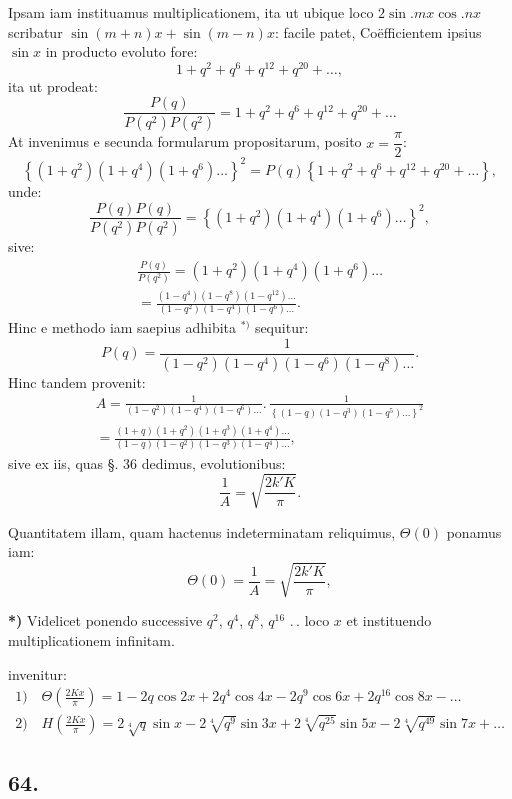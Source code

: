 \documentclass{article}
\begin{document}
Ipsam iam instituamus multiplicationem, ita ut ubique loco $2\sin.mx\cos.nx$ scribatur $\sin(m+n)x+\sin(m-n)x$: facile patet, Coëfficientem ipsius $\sin x$ in producto evoluto fore:
\[
1+q^{2}+q^{6}+q^{12}+q^{20}+\ldots,
\]
ita ut prodeat:
\[
\frac{P(q)}{P(q^{2})P(q^{2})}=1+q^{2}+q^{6}+q^{12}+q^{20}+\ldots
\]
At invenimus e secunda formularum propositarum, posito $x=\dfrac{\pi}{2}$:
\[
\left\{(1+q^{2})(1+q^{4})(1+q^{6})\ldots\right\}^{2}=P(q)\left\{1+q^{2}+q^{6}+q^{12}+q^{20}+\ldots\right\},
\]
unde:
\[
\frac{P(q)P(q)}{P(q^{2})P(q^{2})}=\left\{(1+q^{2})(1+q^{4})(1+q^{6})\ldots\right\}^{2},
\]
sive:
\[
\begin{gathered}
\frac{P(q)}{P(q^{2})}=(1+q^{2})(1+q^{4})(1+q^{6})\ldots\\[1.5ex]
=\frac{(1-q^{4})(1-q^{8})(1-q^{12})\ldots}{(1-q^{2})(1-q^{4})(1-q^{6})\ldots}.
\end{gathered}
\]
Hinc e methodo iam saepius adhibita ${}^{*)}$ sequitur:
\[
P(q)=\frac{1}{(1-q^{2})(1-q^{4})(1-q^{6})(1-q^{8})\ldots}.
\]
Hinc tandem provenit:
\[
\begin{gathered}
A=\frac{1}{(1-q^{2})(1-q^{4})(1-q^{6})\ldots}.\,\frac{1}{\left\{(1-q)(1-q^{3})(1-q^{5})\ldots\right\}^{2}}\\[1.5ex]
=\frac{(1+q)(1+q^{2})(1+q^{3})(1+q^{4})\ldots}{(1-q)(1-q^{2})(1-q^{3})(1-q^{4})\ldots},
\end{gathered}
\]
sive ex iis, quas §. 36 dedimus, evolutionibus:
\[
\frac{1}{A}=\sqrt{\frac{2k'K}{\pi}}.
\]

Quantitatem illam, quam hactenus indeterminatam reliquimus, $\Theta(0)$ ponamus iam:
\[
\Theta(0)=\frac{1}{A}=\sqrt{\frac{2k'K}{\pi}},
\]

\textbf{*)} Videlicet ponendo successive $q^{2}$, $q^{4}$, $q^{8}$, $q^{16}$ $.\,.$ loco $x$ et instituendo multiplicationem infinitam.

invenitur:
\[
\begin{gathered}
\text{1)}\quad\Theta\left(\frac{2Kx}{\pi}\right)=1-2q\cos 2x+2q^{4}\cos 4x-2q^{9}\cos 6x+2q^{16}\cos 8x-\ldots\\[2ex]
\text{2)}\quad H\left(\frac{2Kx}{\pi}\right)=2\sqrt[4]{q}\sin x-2\sqrt[4]{q^{9}}\sin 3x+2\sqrt[4]{q^{25}}\sin 5x-2\sqrt[4]{q^{49}}\sin 7x+\ldots
\end{gathered}
\]

\subsection*{64.}
\end{document}
